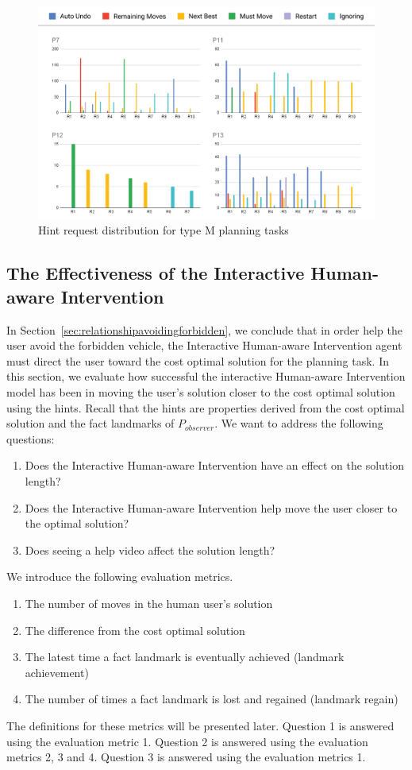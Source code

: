 \begin{figure}[tpb]
  \centering
\includegraphics[width=\columnwidth]{img/requesttypem.png}
  \caption{Hint request distribution for type M planning tasks}
  \label{fig:requesttypem}
\end{figure}

\subsection{The Effectiveness of the Interactive Human-aware Intervention}
In Section~\ref{sec:relationshipavoidingforbidden}, we conclude that in order help the user avoid the forbidden vehicle, the Interactive Human-aware Intervention agent must direct the user toward the cost optimal solution for the planning task.
In this section, we evaluate how successful the interactive Human-aware Intervention model has been in moving the user's solution closer to the cost optimal solution using the hints.
Recall that the hints are properties derived from the cost optimal solution and the fact landmarks of $P_{observer}$.
We want to address the following questions:
\begin{enumerate}
\item Does the Interactive Human-aware Intervention have an effect on the solution length?
\item Does the Interactive Human-aware Intervention help move the user closer to the optimal solution?
\item Does seeing a help video affect the solution length?
\end{enumerate}

We introduce the following evaluation metrics.
\begin{enumerate}
\item The number of moves in the human user's solution
\item The difference from the cost optimal solution
\item The latest time a fact landmark is eventually achieved (landmark achievement)
\item The number of times a fact landmark is lost and regained (landmark regain)
\end{enumerate}
The definitions for these metrics will be presented later.
Question 1 is answered using the evaluation metric 1.
Question 2 is answered using the evaluation metrics 2, 3 and 4.
Question 3 is answered using the evaluation metrics 1.


